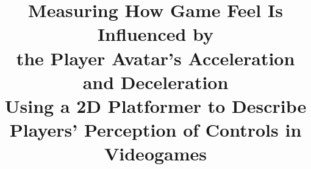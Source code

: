 \documentclass{acm_proc_article-sp}
\begin{document}


  \title{%
  Measuring How Game Feel Is Influenced by\\the Player Avatar's Acceleration and Deceleration\\
  \large Using a 2D Platformer to Describe Players' Perception of Controls in Videogames}






\maketitle















\balancecolumns
\end{document}
